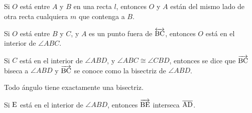 \begin{theorem}
    Si $O$ está entre $A$ y $B$ en una recta $l$, entonces $O$ y $A$ están del mismo lado de otra recta cualquiera $m$ que contenga a $B$.
\end{theorem}

\begin{theorem}
    Si $O$ está entre $B$ y $C$, y $A$ es un punto fuera de $\overleftrightarrow{\rm BC}$, entonces $O$ está en el interior de $\angle{ABC}$.
\end{theorem}

\begin{definition}
    Si $C$ está en el interior de $\angle{ABD}$, y $\angle{ABC} \cong \angle{CBD}$, entonces se dice que $\overrightarrow{\rm BC}$ biseca a $\angle{ABD}$ y $\overrightarrow{\rm BC}$ se conoce como la bisectriz de $\angle{ABD}$. 

    \begin{figure}[!h]
        \centering
        
        \label{fig:angle-bisector}
    \end{figure}
    
\end{definition}

\begin{theorem}
    Todo ángulo tiene exactamente una bisectriz.
\end{theorem}

\begin{theorem}
    Si $\rm E$ está en el interior de $\angle{ABD}$, entonces $\overrightarrow{\rm BE}$ interseca $\overline{\rm AD}$.
\end{theorem}